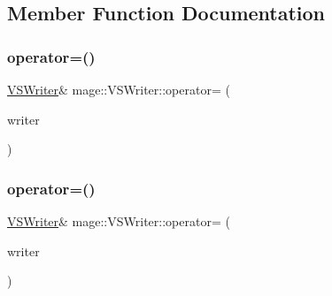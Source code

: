 \subsection{Member Function Documentation}
\hypertarget{classmage_1_1_v_s_writer_af943d317ae357723a08b2bbf2bab23ba}{}\label{classmage_1_1_v_s_writer_af943d317ae357723a08b2bbf2bab23ba} 
\subsubsection{\texorpdfstring{operator=()}{operator=()}\hspace{0.1cm}{\footnotesize\ttfamily [1/2]}}
{\footnotesize\ttfamily \hyperlink{classmage_1_1_v_s_writer}{V\+S\+Writer}\& mage\+::\+V\+S\+Writer\+::operator= (\begin{DoxyParamCaption}\item[{const \hyperlink{classmage_1_1_v_s_writer}{V\+S\+Writer} \&}]{writer }\end{DoxyParamCaption})\hspace{0.3cm}{\ttfamily [delete]}}

\hypertarget{classmage_1_1_v_s_writer_af1dca5c791cfb62967cd2437f7db170a}{}\label{classmage_1_1_v_s_writer_af1dca5c791cfb62967cd2437f7db170a} 
\subsubsection{\texorpdfstring{operator=()}{operator=()}\hspace{0.1cm}{\footnotesize\ttfamily [2/2]}}
{\footnotesize\ttfamily \hyperlink{classmage_1_1_v_s_writer}{V\+S\+Writer}\& mage\+::\+V\+S\+Writer\+::operator= (\begin{DoxyParamCaption}\item[{\hyperlink{classmage_1_1_v_s_writer}{V\+S\+Writer} \&\&}]{writer }\end{DoxyParamCaption})\hspace{0.3cm}{\ttfamily [delete]}}

\hypertarget{classmage_1_1_v_s_writer_a1d106607f69bbd5989a259bbf60262fb}{}\label{classmage_1_1_v_s_writer_a1d106607f69bbd5989a259bbf60262fb} 
